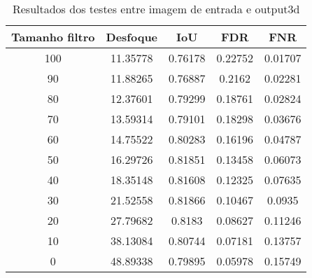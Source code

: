 \begin{table}[h]
    \centering
    \caption{Resultados dos testes entre imagem de entrada e output3d}
    \label{tab:blur_solution_input_output_3d}
    \begin{tabular}{|c|c|c|c|c|}
        \hline
        Tamanho filtro & Desfoque & IoU & FDR & FNR \\
        \hline
        100 & 11.35778 & 0.76178 & 0.22752 & 0.01707\\
        90 & 11.88265 & 0.76887 & 0.2162 & 0.02281\\
        80 & 12.37601 & 0.79299 & 0.18761 & 0.02824\\
        70 & 13.59314 & 0.79101 & 0.18298 & 0.03676\\
        60 & 14.75522 & 0.80283 & 0.16196 & 0.04787\\
        50 & 16.29726 & 0.81851 & 0.13458 & 0.06073\\
        40 & 18.35148 & 0.81608 & 0.12325 & 0.07635\\
        30 & 21.52558 & 0.81866 & 0.10467 & 0.0935\\
        20 & 27.79682 & 0.8183 & 0.08627 & 0.11246\\
        10 & 38.13084 & 0.80744 & 0.07181 & 0.13757\\
        0 & 48.89338 & 0.79895 & 0.05978 & 0.15749\\
        \hline
    \end{tabular}
\end{table}


